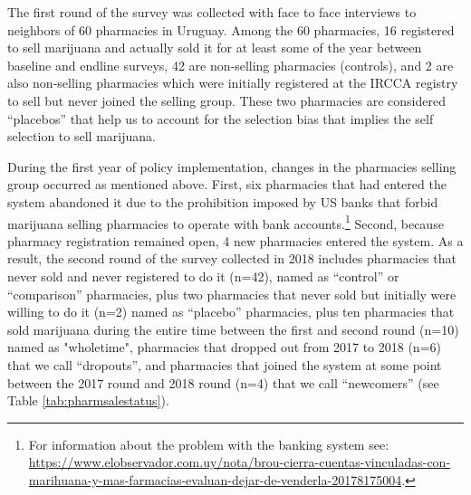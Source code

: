 \documentclass[11pt]{article}
\begin{document}
The first round of the survey was collected with face to face interviews to neighbors of 60 pharmacies in Uruguay. Among the 60 pharmacies, 16 registered to sell marijuana and actually sold it for at least some of the year between baseline and endline surveys, 42 are non-selling pharmacies (controls), and 2 are also non-selling pharmacies which were initially registered at the IRCCA registry to sell but never joined the selling group. These two pharmacies are considered ``placebos'' that help us to account for the selection bias that implies the self selection to sell marijuana.

During the first year of policy implementation, changes in the pharmacies selling group occurred as mentioned above. First, six pharmacies that had entered the system abandoned it due to the prohibition imposed by US banks that forbid marijuana selling pharmacies to operate with bank accounts.\footnote{For information about the problem with the banking system see: \url{https://www.elobservador.com.uy/nota/brou-cierra-cuentas-vinculadas-con-marihuana-y-mas-farmacias-evaluan-dejar-de-venderla-20178175004}.} Second,  because pharmacy registration remained open, 4 new pharmacies entered the system. As a result, the second round of the survey collected in 2018 includes pharmacies that never sold and never registered to do it (n=42), named as ``control'' or ``comparison'' pharmacies, plus two pharmacies that never sold but initially were willing to do it (n=2) named as ``placebo'' pharmacies, plus ten pharmacies that sold marijuana during the entire time between the first and second round (n=10) named as "wholetime", pharmacies that dropped out from 2017 to 2018 (n=6) that we call ``dropouts'', and pharmacies that joined the system at some point between the 2017 round and 2018 round (n=4) that we call ``newcomers'' (see Table \ref{tab:pharmsalestatus}).
\end{document}
